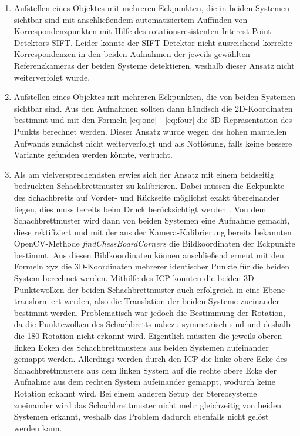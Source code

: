 \begin{enumerate}
	\item Aufstellen eines Objektes mit mehreren Eckpunkten, die in beiden Systemen sichtbar sind mit anschließendem automatisiertem Auffinden von Korrespondenzpunkten mit Hilfe des rotationsresistenten Interest-Point-Detektors SIFT. Leider konnte der SIFT-Detektor nicht ausreichend korrekte Korrespondenzen in den beiden Aufnahmen der jeweils gewählten Referenzkameras der beiden Systeme detektieren, weshalb dieser Ansatz nicht weiterverfolgt wurde.
	
	
	\item Aufstellen eines Objektes mit mehreren Eckpunkten, die von beiden Systemen sichtbar sind. Aus den Aufnahmen sollten dann händisch die 2D-Koordinaten bestimmt und mit den Formeln 
	\ref{eq:one} - \ref{eq:four} die 3D-Repräsentation des Punkts berechnet werden. Dieser Ansatz wurde wegen des hohen manuellen Aufwands zunächst nicht weiterverfolgt und als Notlösung, falls keine bessere Variante gefunden werden könnte, verbucht. 
	
	\item Als am vielversprechendsten erwies sich der Ansatz mit einem beidseitig bedruckten Schachbrettmuster zu kalibrieren. Dabei müssen die Eckpunkte des Schachbretts auf Vorder- und Rückseite möglichst exakt übereinander liegen, dies muss bereits beim Druck berücksichtigt werden \cite{paper}. Von dem Schachbrettmuster wird dann von beiden Systemen eine Aufnahme gemacht, diese rektifiziert und mit der aus der Kamera-Kalibrierung bereits bekannten OpenCV-Methode \textit{findChessBoardCorners} die Bildkoordinaten der Eckpunkte bestimmt. Aus diesen Bildkoordinaten können anschließend erneut mit den Formeln xyz die 3D-Koordinaten mehrerer identischer Punkte für die beiden System berechnet werden. \newline 
	\noindent Mithilfe des ICP konnten die beiden 3D-Punktewolken der beiden Schachbrettmuster auch erfolgreich in eine Ebene transformiert werden, also die Translation der beiden Systeme zueinander bestimmt werden. Problematisch war jedoch die Bestimmung der Rotation, da die Punktewolken des Schachbretts nahezu symmetrisch sind und deshalb die 180\degree-Rotation nicht erkannt wird. Eigentlich müssten die jeweils oberen linken Ecken des Schachbrettmusters aus beiden Systemen aufeinander gemappt werden. Allerdings werden durch den ICP die linke obere Ecke des Schachbrettmusters aus dem linken System auf die rechte obere Ecke der Aufnahme aus dem rechten System aufeinander gemappt, wodurch keine Rotation erkannt wird. Bei einem anderen Setup der Stereosysteme zueinander wird das Schachbrettmuster nicht mehr gleichzeitig von beiden Systemen erkannt, weshalb das Problem dadurch ebenfalls nicht gelöst werden kann.
	
\end{enumerate}

